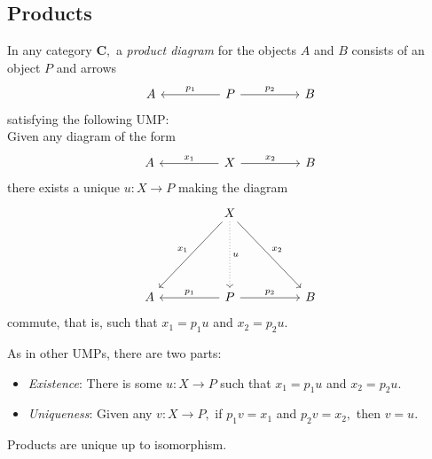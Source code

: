 \subsection{Products}
\begin{defn} 
	In any category $\mathbf{C},$ a \emph{product diagram} for the objects $A$ and $B$ consists of an object $P$ and arrows
	\begin{equation*} 
		\begin{tikzcd}
			A && P \arrow[ll, "p_1"'] \arrow[rr, "p_2"] && B
		\end{tikzcd}
	\end{equation*}
	satisfying the following UMP:\\
	Given any diagram of the form
	\begin{equation*} 
		\begin{tikzcd}
			A && X \arrow[ll, "x_1"'] \arrow[rr, "x_2"] && B
		\end{tikzcd}
	\end{equation*}
	there exists a unique $u:X\to P$ making the diagram
	\begin{equation*} 
		\begin{tikzcd}
			&& X \arrow[llddd, "x_1"'] \arrow[rrddd, "x_2"] \arrow[ddd, dotted, "u"] &&\\
			&&&&\\&&&&\\
			A && P \arrow[ll, "p_1"'] \arrow[rr, "p_2"] && B
		\end{tikzcd}
	\end{equation*}
	commute, that is, such that $x_1 = p_1u$ and $x_2 = p_2u.$
\end{defn}
\remark{\label{rem:UMP-prod}} As in other UMPs, there are two parts:
\begin{itemize}
	\item \emph{Existence}: There is some $u:X\to P$ such that $x_1 = p_1u$ and $x_2 = p_2u.$
	\item \emph{Uniqueness}: Given any $v:X\to P,$ if $p_1v = x_1$ and $p_2v = x_2,$ then $v = u.$ 
\end{itemize}
\begin{prop} \label{prop:prodiso}
	Products are unique up to isomorphism.
\end{prop}
